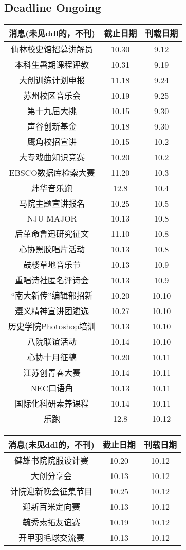 \documentclass[letterpaper, 12pt]{article}
\begin{document}
\begin{multicols}{2}
\section{Deadline Ongoing}
\begin{tabular}{|c|c|c|}
    \hline
    消息(未见ddl的，不刊) & 截止日期 & 刊载日期\\
    \hline\hline
    仙林校史馆招募讲解员 & 10.30 & 9.12\\
    本科生暑期课程评教 & 10.31 & 9.19\\
    大创训练计划申报 & 11.18 & 9.24\\
    苏州校区音乐会 & 10.19 & 9.25\\
    第十九届大挑 & 10.15 & 9.30\\
    声谷创新基金 & 10.18 & 9.30\\
    鹰角校招宣讲 & 10.15 & 10.2\\
    大专戏曲知识竞赛 & 10.20 & 10.2\\
    EBSCO数据库检索大赛 & 11.20 & 10.3\\
    炜华音乐跑 & 12.8 & 10.4\\
    马院主题宣讲报名 & 10.25 & 10.5\\
    NJU MAJOR & 10.13 & 10.8\\
    后革命鲁迅研究征文 & 11.10 & 10.8\\
    心协黑胶唱片活动 & 10.13 & 10.8\\
    鼓楼草地音乐节 & 10.13 & 10.9\\
    重唱诗社匿名评诗会 & 10.13 & 10.9\\
    “南大新传”编辑部招新 & 10.20 & 10.10\\
    遵义精神宣讲团遴选 & 10.27 & 10.10\\
    历史学院Photoshop培训 & 10.13 & 10.10\\
    八院联谊活动 & 10.14 & 10.10\\
    心协十月征稿 & 10.20 & 10.11\\
    江苏创青春大赛 & 10.14 & 10.11\\
    NEC口语角 & 10.13 & 10.11\\
    国际化科研素养课程 & 10.14 & 10.11\\
    乐跑 & 12.8 & 10.12\\
    \hline
\end{tabular}
\begin{tabular}{|c|c|c|}
    \hline
    消息(未见ddl的，不刊) & 截止日期 & 刊载日期\\
    \hline\hline
    健雄书院院服设计赛 & 10.20 & 10.12\\
    大创分享会 & 10.13 & 10.12\\
    计院迎新晚会征集节目 & 10.25 & 10.12\\
    迎新百米定向赛 & 10.13 & 10.12\\
    毓秀素拓友谊赛 & 10.19 & 10.12\\
    开甲羽毛球交流赛 & 10.13 & 10.12\\
    

\end{tabular}
\end{multicols}
\end{document}
